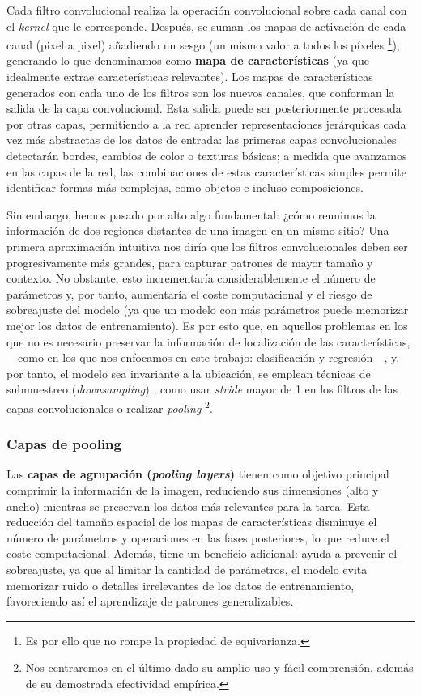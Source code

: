 Cada filtro convolucional realiza la operación convolucional sobre cada canal con el \textit{kernel} que le 
corresponde. Después, se suman los mapas de activación de cada canal (pixel a pixel) añadiendo un sesgo 
(un mismo valor a todos los píxeles
\footnote{
    Es por ello que no rompe la propiedad de equivarianza.
}),
generando lo que denominamos como \textbf{mapa de características} (ya que idealmente extrae 
características relevantes). Los mapas de características generados con cada uno de los filtros son los nuevos 
canales, que conforman la salida de la capa convolucional. Esta salida puede ser posteriormente procesada por 
otras capas, permitiendo a la red aprender representaciones jerárquicas cada vez más abstractas de los datos 
de entrada: las primeras capas convolucionales detectarán bordes, cambios de color o texturas básicas; a 
medida que avanzamos en las capas de la red, las combinaciones de estas características simples permite 
identificar formas más complejas, como objetos e incluso composiciones.

Sin embargo, hemos pasado por alto algo fundamental: ¿cómo reunimos la información de dos regiones distantes 
de una imagen en un mismo sitio? Una primera aproximación intuitiva nos diría que los filtros convolucionales 
deben ser progresivamente más grandes, para capturar patrones de mayor tamaño y contexto. No obstante, esto
incrementaría considerablemente el número de parámetros y, por tanto, aumentaría el coste computacional y 
el riesgo de sobreajuste del modelo (ya que un modelo con más parámetros puede memorizar mejor los
datos de entrenamiento). Es por esto que, en aquellos problemas en los que no es necesario preservar la 
información de localización de las características, ---como en los que nos enfocamos en este trabajo: 
clasificación y regresión---, y, por tanto, el modelo sea invariante a la ubicación, se emplean técnicas de 
submuestreo (\textit{downsampling}) \cite{murphy2022}, como usar \textit{stride} mayor de 1 en los filtros
de las capas convolucionales o realizar \textit{pooling}
\footnote{
    Nos centraremos en el último dado su amplio uso y fácil comprensión, además de su demostrada efectividad 
    empírica.
}.



\subsubsection{Capas de pooling}

Las \textbf{capas de agrupación (\textit{pooling layers})} tienen como objetivo principal comprimir la 
información de la imagen, reduciendo sus dimensiones (alto y ancho) mientras se preservan los datos más 
relevantes para la tarea. Esta reducción del tamaño espacial de los mapas de características disminuye el 
número de parámetros y operaciones en las fases posteriores, lo que reduce el coste computacional. Además, 
tiene un beneficio adicional: ayuda a prevenir el sobreajuste, ya que al limitar la cantidad de parámetros, 
el modelo evita memorizar ruido o detalles irrelevantes de los datos de entrenamiento, favoreciendo así el 
aprendizaje de patrones generalizables.

